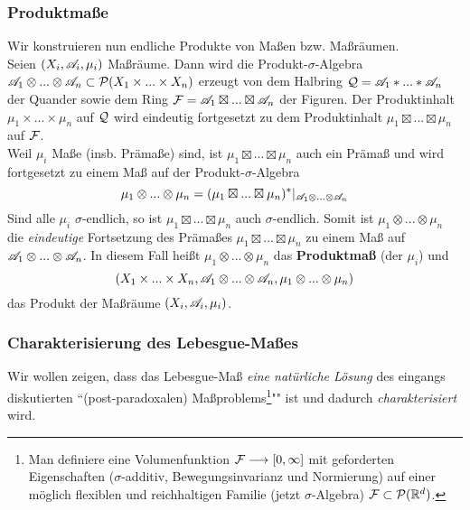 \subsubsection{Produktmaße}
Wir konstruieren nun endliche Produkte von Maßen bzw. Maßräumen.
\vspace{0.5pc}
\\Seien $(X_i,\AA_i,\mu_i)$ Maßräume. Dann wird die Produkt-$\sigma$-Algebra $\AA_1 \otimes ... \otimes \AA_n \subset \PP(X_1\times ... \times X_n)$ erzeugt von dem Halbring $\QQ =\AA_1 \ast ... \ast \AA_n$ der Quander sowie dem Ring $\FF=\AA_1 \boxtimes ... \boxtimes \AA_n$ der Figuren. Der Produktinhalt $\mu_1 \times ... \times \mu_n$ auf $\QQ$ wird eindeutig fortgesetzt zu dem Produktinhalt $\mu_1 \boxtimes ... \boxtimes \mu_n$ auf $\FF$.
\vspace{0.5pc}
\\ Weil $\mu_i$ Maße (insb. Prämaße) sind, ist $\mu_1 \boxtimes ... \boxtimes \mu_n$ auch ein Prämaß und wird fortgesetzt zu einem Maß auf der Produkt-$\sigma$-Algebra
$$
\mu_1 \otimes ... \otimes \mu_n =  (\mu_1 \boxtimes ... \boxtimes \mu_n)^*|_{\AA_1 \otimes ... \otimes \AA_n}
$$
Sind alle $\mu_i$ $\sigma$-endlich, so ist $\mu_1 \boxtimes ... \boxtimes \mu_n$ auch $\sigma$-endlich. Somit ist $\mu_1 \otimes ... \otimes \mu_n $ die \emph{eindeutige} Fortsetzung des Prämaßes $\mu_1 \boxtimes ... \boxtimes \mu_n$ zu einem Maß auf $\AA_1 \otimes ... \otimes \AA_n$. In diesem Fall heißt $\mu_1 \otimes ... \otimes \mu_n$ das \textbf{Produktmaß} (der $\mu_i$) und 
$$
(X_1 \times ... \times X_n, \AA_1 \otimes ... \otimes \AA_n, \mu_1 \otimes ... \otimes \mu_n)
$$
das Produkt der Maßräume $(X_i,\AA_i,\mu_i)$.


\subsubsection{Charakterisierung des Lebesgue-Maßes} \label{sssec:I.5.11}
Wir wollen zeigen, dass das Lebesgue-Maß \emph{eine natürliche Lösung} des eingangs diskutierten ``(post-paradoxalen) Maßproblems\footnote{Man definiere eine Volumenfunktion $\FF \longrightarrow [0,\infty]$ mit geforderten Eigenschaften ($\sigma$-additiv, Bewegungsinvarianz und Normierung) auf einer möglich flexiblen und reichhaltigen Familie (jetzt $\sigma$-Algebra) $\FF\subset \PP(\R^d)$.}"" ist und dadurch \emph{charakterisiert} wird.


